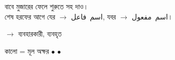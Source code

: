 \vspace{0.4cm}

 বাবে
মুজারের {\arabicfont \textarabic{}} ফেলে শুরুতে সহ  দাও।\\
শেষ হরফের আগে যের $\rightarrow$ \mbox{\arabicfont \textarabic{اسم فاعل}},
যবর $\rightarrow$ \mbox{\arabicfont \textarabic{اسم مفعول}}।

\begin{center}
  {\arabicfont {}}
  $\rightarrow$
  {\arabicfont \gmustamil} ব্যবহারকারী,
  \enspace
  {\arabicfont \gmustamal} ব্যবহৃত
\end{center}

\vspace{0.2cm}

\begin{center}
  \small
  কালো = মূল অক্ষর
  \enspace$\bullet$\enspace
  \enspace$\bullet$\enspace
\end{center}

